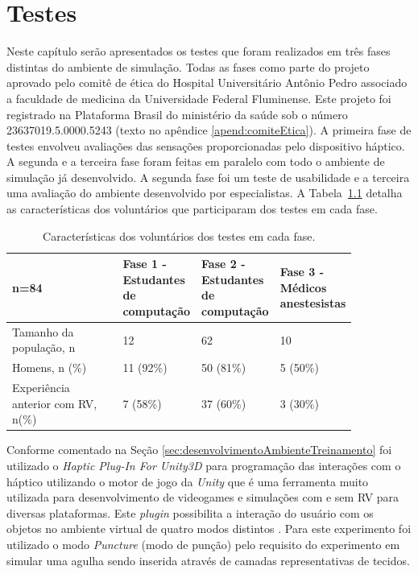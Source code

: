 \chapter{Testes} \label{cap:cap6}

Neste capítulo serão apresentados os testes que foram realizados em três fases distintas do ambiente de simulação. Todas as fases como parte do projeto aprovado pelo comitê de ética do Hospital Universitário Antônio Pedro associado a faculdade de medicina da Universidade Federal Fluminense. Este projeto foi registrado na Plataforma Brasil do ministério da saúde sob o número 23637019.5.0000.5243 (texto no apêndice \ref{apend:comiteEtica}). A primeira fase de testes envolveu avaliações das sensações proporcionadas pelo dispositivo háptico. A segunda e a terceira fase foram feitas em paralelo com todo o ambiente de simulação já desenvolvido. A segunda fase foi um teste de usabilidade e a terceira uma avaliação do ambiente desenvolvido por especialistas.
A Tabela~\ref{tab:tabelaCaracteristicasVoluntarios} detalha as características dos voluntários que participaram dos testes em cada fase.

\begin{table}[!ht]
\begin{center}
\caption{Características dos voluntários dos testes em cada fase.}
\label{tab:tabelaCaracteristicasVoluntarios}
\begin{tabular}{|p{0.4\linewidth}|p{0.15\linewidth}|p{0.15\linewidth}|p{0.15\linewidth}|}
\hline
\textbf{n=84} & \textbf{Fase 1 - Estudantes de computação} & \textbf{Fase 2 - Estudantes de computação} & \textbf{Fase 3 - Médicos anestesistas}\\
\hline\hline
Tamanho da população, n & 12 & 62 & 10\\
Homens, n (\%) & 11 (92\%) & 50 (81\%) &  5 (50\%)\\
Experiência anterior com RV, n(\%) & 7 (58\%)  & 37 (60\%) & 3 (30\%) \\
\hline
\end{tabular}
\end{center}
\end{table}

Conforme comentado na Seção \ref{sec:desenvolvimentoAmbienteTreinamento} foi utilizado o \textit{Haptic Plug-In For Unity3D} para programação das interações com o háptico utilizando o motor de jogo da \textit{Unity} \cite{UnityTechnologies2020} que é uma ferramenta muito utilizada para desenvolvimento de videogames e simulações com e sem \acrshort{RV} para diversas plataformas.
Este \textit{plugin} possibilita a interação do usuário com os objetos no ambiente virtual  de quatro modos distintos \cite{Poyade2014}. Para este experimento foi utilizado o modo \textit{Puncture} (modo de punção) pelo requisito do experimento em simular uma agulha sendo inserida através de camadas representativas de tecidos.

